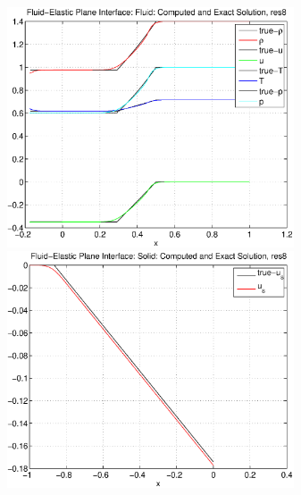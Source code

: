 {
\newcommand{\fwidth}{8.5cm}
\begin{figure}[h]
\includegraphics[width=\fwidth]{fluidElastic_planeInterfaceFluid_res8.eps}
\includegraphics[width=\fwidth]{fluidElastic_planeInterfaceSolid_res8.eps}

\end{figure}}
